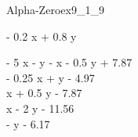 
\begin{bilevelmodel}{Alpha-Zero}{ex9_1_9}
    \begin{upperlevel}{- 0.2 x + 0.8 y}{
        
    }
    \end{upperlevel}
    \begin{lowerlevel}{- 5 x - y}{
         - x - 0.5 y + 7.87  \\ 
 - 0.25 x + y - 4.97  \\ 
 x + 0.5 y - 7.87  \\ 
 x - 2 y - 11.56  \\ 
 - y - 6.17 
    }
    \end{lowerlevel}
\end{bilevelmodel}
    
        